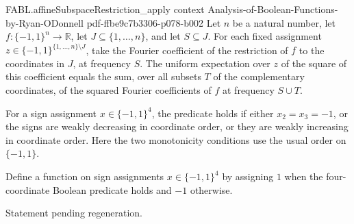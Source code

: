 \begin{theorem}
\proofstep
  {FABL.affineSubspaceRestriction_apply}
  {context}
  {Analysis-of-Boolean-Functions-by-Ryan-ODonnell}
  {pdf-ffbe9c7b3306-p078-b002}
Let $n$ be a natural number, let $f\colon\{-1,1\}^n\to\mathbb{R}$, let
$J\subseteq\{1,\ldots,n\}$, and let $S\subseteq J$. For each fixed assignment
$z\in\{-1,1\}^{\{1,\ldots,n\}\setminus J}$, take the Fourier coefficient of the
restriction of $f$ to the coordinates in $J$, at frequency $S$. The uniform expectation
over $z$ of the square of this coefficient equals the sum, over all subsets $T$ of the
complementary coordinates, of the squared Fourier coefficients of $f$ at frequency
$S\cup T$.
\end{theorem}

\begin{definition}
\label{FABL.example3_19Predicate}
\leanok
{}
For a sign assignment $x\in\{−1,1\}^{4}$, the predicate holds if either $x_2=x_3=-1$, or
the signs are weakly decreasing in coordinate order, or they are weakly increasing in
coordinate order. Here the two monotonicity conditions use the usual order on
$\{−1,1\}$.
\end{definition}

\begin{definition}
\label{FABL.example3_19Function}
\leanok
{}
Define a function on sign assignments $x\in\{−1,1\}^{4}$ by assigning $1$ when the
four-coordinate Boolean predicate holds and $-1$ otherwise.
\end{definition}

\begin{theorem}
\label{FABL.example3_19Function_eq_one_iff}
\leanok
{}
Statement pending regeneration.
\end{theorem}


